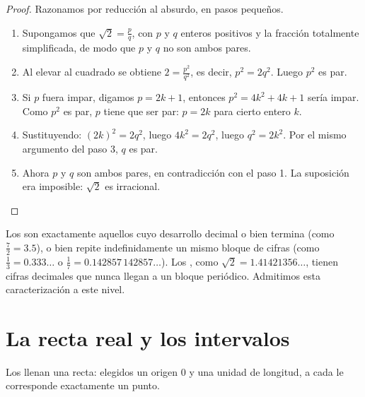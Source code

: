 \begin{proof}
Razonamos por reducción al absurdo, en pasos pequeños.
\begin{enumerate}
  \item Supongamos que $\sqrt 2 = \frac{p}{q}$, con $p$ y $q$ enteros
        positivos y la fracción totalmente simplificada, de modo que $p$ y
        $q$ no son ambos pares.
  \item Al elevar al cuadrado se obtiene $2 = \frac{p^2}{q^2}$, es decir,
        $p^2 = 2q^2$. Luego $p^2$ es par.
  \item Si $p$ fuera impar, digamos $p = 2k+1$, entonces
        $p^2 = 4k^2 + 4k + 1$ sería impar. Como $p^2$ es par, $p$ tiene que
        ser par: $p = 2k$ para cierto entero $k$.
  \item Sustituyendo: $(2k)^2 = 2q^2$, luego $4k^2 = 2q^2$, luego
        $q^2 = 2k^2$. Por el mismo argumento del paso 3, $q$ es par.
  \item Ahora $p$ y $q$ son ambos pares, en contradicción con el paso 1.
        La suposición era imposible: $\sqrt 2$ es irracional.
\end{enumerate}
\end{proof}

\begin{remark}
Los  son exactamente aquellos cuyo desarrollo decimal o
bien termina (como $\frac72 = 3.5$), o bien repite indefinidamente un
mismo bloque de cifras (como $\frac13 = 0.333\dots$ o
$\frac{1}{7} = 0.142857\,142857\dots$). Los , como
$\sqrt2 = 1.41421356\dots$, tienen cifras decimales que nunca llegan a un
bloque periódico. Admitimos esta caracterización a este nivel.
\end{remark}

\section{La recta real y los intervalos}

Los  llenan una recta: elegidos un origen $0$ y una unidad de
longitud, a cada  le corresponde exactamente un punto.

